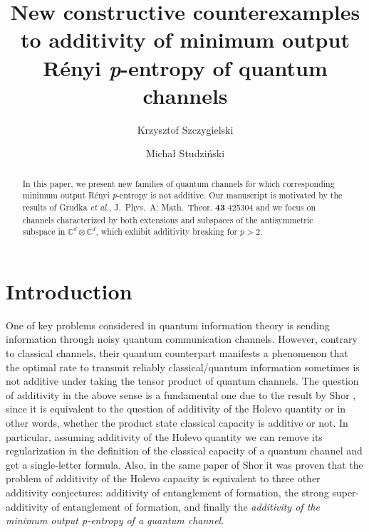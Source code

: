 \documentclass[reqno]{amsart}
\theoremstyle{plain}
\theoremstyle{note}
\newcommand{\complexes}{\mathbb{C}}
\begin{document}
 	
\title[New constructive counterexamples to additivity...]{New constructive counterexamples to additivity of minimum output R\'{e}nyi \textit{p}-entropy of quantum channels}

\author{Krzysztof Szczygielski}
\address[K.~Szczygielski]
{Institute of Physics, Faculty of Physics, Astronomy and Informatics, Nicolaus Copernicus University in Toru\'n, Grudzi\c{a}dzka 5/7, 87–100, Toruń, Poland}

\author{Micha{\l} Studzi\'{n}ski}
\address[M. Studzi\'{n}ski]
{Institute of Theoretical Physics and Astrophysics, Faculty of Mathematics, Physics and Informatics, University of Gda\'nsk, Wita Stwosza 57, 80-308 Gda\'nsk, Poland}

\begin{abstract}
In this paper, we present new families of quantum channels for which corresponding minimum output R\'{e}nyi \textit{p}-entropy is not additive. Our manuscript is motivated by the results of Grudka \textit{et al.}, J.~Phys.~A: Math.~Theor. \textbf{43} 425304 and we focus on channels characterized by both extensions and subspaces of the antisymmetric subspace in $\complexes^d \otimes \complexes^d$, which exhibit additivity breaking for $p>2$. 
\end{abstract}

\maketitle

\section{Introduction}
One of key problems considered in quantum information theory is sending information through noisy quantum communication channels. However, contrary to classical channels, their quantum counterpart manifests a phenomenon that the optimal rate to transmit reliably classical/quantum information sometimes is not additive under taking the tensor product of quantum channels. The question of additivity in the above sense is a fundamental one due to the result by Shor \cite{Shor2004}, since it is equivalent to the question of additivity of the Holevo quantity \cite{Holevo} or in other words, whether the product state classical capacity is additive or not. In particular, assuming additivity of the Holevo quantity we can remove its regularization in the definition of the classical capacity of a quantum channel and get a single-letter formula. Also, in the same paper of Shor it was proven that the problem of additivity of the Holevo capacity is equivalent to three other additivity conjectures: additivity of entanglement of formation, the strong super-additivity of entanglement of formation, and finally the \textit{additivity of the minimum output \textit{p}-entropy of a quantum channel}.
\end{document}
